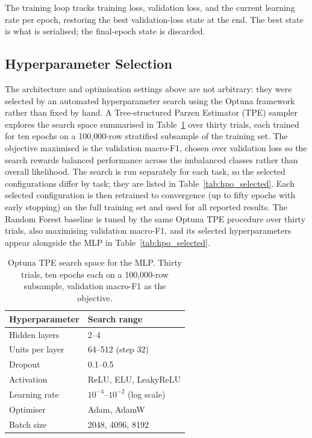 \par The training loop tracks training loss, validation loss, and the current learning rate per epoch, restoring the best validation-loss state at the end. The best state is what is serialised; the final-epoch state is discarded.

\subsection{Hyperparameter Selection}
\label{subsec:hpo}

\par The architecture and optimisation settings above are not arbitrary: they were selected by an automated hyperparameter search using the Optuna framework \cite{Akiba2019} rather than fixed by hand. A Tree-structured Parzen Estimator (TPE) sampler explores the search space summarised in Table~\ref{tab:hpo_space} over thirty trials, each trained for ten epochs on a 100{,}000-row stratified subsample of the training set. The objective maximised is the validation macro-F1, chosen over validation loss so the search rewards balanced performance across the imbalanced classes rather than overall likelihood. The search is run separately for each task, so the selected configurations differ by task; they are listed in Table~\ref{tab:hpo_selected}. Each selected configuration is then retrained to convergence (up to fifty epochs with early stopping) on the full training set and used for all reported results. The Random Forest baseline is tuned by the same Optuna TPE procedure over thirty trials, also maximising validation macro-F1, and its selected hyperparameters appear alongside the MLP in Table~\ref{tab:hpo_selected}.

\begin{table}[htbp]
\begin{center}
\begin{tabular}{|p{120pt}|p{200pt}|}
\hline
\textbf{Hyperparameter} & \textbf{Search range} \\
\hline
\hline Hidden layers & 2--4 \\
\hline Units per layer & 64--512 (step 32) \\
\hline Dropout & 0.1--0.5 \\
\hline Activation & ReLU, ELU, LeakyReLU \\
\hline Learning rate & $10^{-4}$--$10^{-2}$ (log scale) \\
\hline Optimiser & Adam, AdamW \\
\hline Batch size & 2048, 4096, 8192 \\
\hline
\end{tabular}
\end{center}
\caption{Optuna TPE search space for the MLP. Thirty trials, ten epochs each on a 100{,}000-row subsample, validation macro-F1 as the objective.}
\label{tab:hpo_space}
\end{table}

